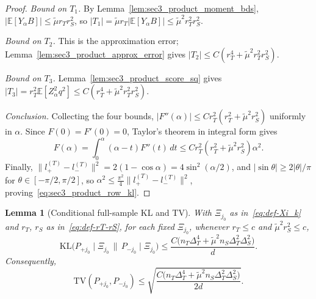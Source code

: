 \documentclass[10pt]{article}
\newtheorem{lemma}{Lemma}
\newcommand{\Ebb}{\mathbb E}
\newcommand{\KL}{\mathrm{KL}}
\newcommand{\TV}{\mathrm{TV}}
\newcommand{\trg}{T}
\newcommand{\nT}{n_{\trg}}
\newcommand{\DeltaT}{\Delta_{\trg}}
\newcommand{\src}{S}
\newcommand{\nS}{n_{\src}}
\newcommand{\DeltaS}{\Delta_{\src}}
\begin{document}
\begin{proof}
\textit{Bound on $T_1$.}
By Lemma~\ref{lem:sec3_product_moment_bds}, $|\Ebb[Y_\alpha B]|\le\tilde\mu r_T r_S^2$,
so $|T_1|=\tilde\mu r_T|\Ebb[Y_\alpha B]|\le\tilde\mu^2 r_T^2 r_S^2$.

\textit{Bound on $T_2$.}
This is the approximation error; Lemma~\ref{lem:sec3_product_approx_error} gives
$|T_2|\le C(r_T^4+\tilde\mu^2 r_T^2 r_S^2)$.

\textit{Bound on $T_3$.}
Lemma~\ref{lem:sec3_product_score_sq} gives
$|T_3|=r_T^2\Ebb[Z_\alpha^2 q^2]\le C(r_T^4+\tilde\mu^2 r_T^2 r_S^2)$.

\textit{Conclusion.}
Collecting the four bounds,
$|F''(\alpha)|\le Cr_T^2(r_T^2+\tilde\mu^2 r_S^2)$ uniformly in $\alpha$.
Since $F(0)=F'(0)=0$, Taylor's theorem in integral form gives
\[
    F(\alpha) = \int_0^\alpha(\alpha-t)F''(t)\,dt
    \le Cr_T^2(r_T^2+\tilde\mu^2 r_S^2)\alpha^2.
\]
Finally, $\|l^{(\trg)}_+-l^{(\trg)}_-\|^2=2(1-\cos\alpha)=4\sin^2(\alpha/2)$,
and $|\sin\theta|\ge 2|\theta|/\pi$ for $\theta\in[-\pi/2,\pi/2]$, so
$\alpha^2\le\frac{\pi^2}{4}\|l^{(\trg)}_+-l^{(\trg)}_-\|^2$,
proving~\eqref{eq:sec3_product_row_kl}.
\end{proof}

\begin{lemma}[Conditional full-sample KL and TV]
\label{lem:sec3_product_full_kl}
With $\Xi_{j_0}$ as in~\eqref{eq:def-Xi_k} and $r_T$, $r_S$ as in~\eqref{eq:def-rT-rS}, for each fixed $\Xi_{j_0}$,
whenever $r_T\le c$ and $\tilde\mu^2 r_S^2\le c$,
\begin{equation}
\label{eq:sec3_product_kl_bound}
    \KL\!\bigl(P_{+j_0}\mid\Xi_{j_0}\,\big\|\,P_{-j_0}\mid\Xi_{j_0}\bigr)
    \le
    \frac{C\bigl(\nT\DeltaT^4+\tilde\mu^2\nS\DeltaT^2\DeltaS^2\bigr)}{d}.
\end{equation}
Consequently,
\begin{equation}
\label{eq:sec3_product_tv_cond}
    \TV(P_{+j_0},P_{-j_0})
    \le
    \sqrt{\frac{C\bigl(\nT\DeltaT^4+\tilde\mu^2\nS\DeltaT^2\DeltaS^2\bigr)}{2d}}.
\end{equation}
\end{lemma}
\end{document}
